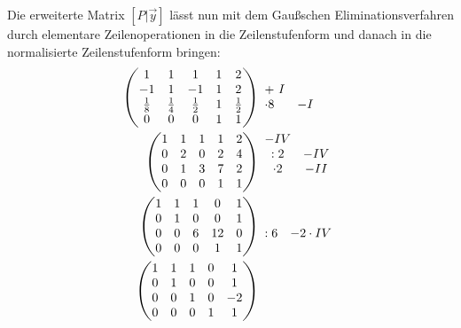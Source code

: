 Die erweiterte Matrix $\displaystyle [ P|\vec{y}]$ lässt nun mit dem Gaußschen Eliminationsverfahren durch elementare Zeilenoperationen in die Zeilenstufenform und danach in die normalisierte Zeilenstufenform bringen:
\begin{align*}
	\begin{pmatrix}
		1 & 1 & 1 & 1 & 2\\
		-1 & 1 & -1 & 1 & 2\\
		\frac{1}{8} & \frac{1}{4} & \frac{1}{2} & 1 & \frac{1}{2}\\
		0 & 0 & 0 & 1 & 1
	\end{pmatrix} & \begin{array}{ l c }
		& \\
		+\ I & \\
		\cdot 8 & -I\\
		& 
	\end{array}\\
	\begin{pmatrix}
		1 & 1 & 1 & 1 & 2\\
		0 & 2 & 0 & 2 & 4\\
		0 & 1 & 3 & 7 & 2\\
		0 & 0 & 0 & 1 & 1
	\end{pmatrix} & \begin{array}{ c c }
		-IV & \\
		:2 & -IV\\
		\cdot 2 & -II\\
		& 
	\end{array}\\
	\begin{pmatrix}
		1 & 1 & 1 & 0 & 1\\
		0 & 1 & 0 & 0 & 1\\
		0 & 0 & 6 & 12 & 0\\
		0 & 0 & 0 & 1 & 1
	\end{pmatrix} & \begin{array}{ c c }
		& \\
		& \\
		:6 & -2\cdot IV\\
		& 
	\end{array}\\
	\begin{pmatrix}
		1 & 1 & 1 & 0 & 1\\
		0 & 1 & 0 & 0 & 1\\
		0 & 0 & 1 & 0 & -2\\
		0 & 0 & 0 & 1 & 1
	\end{pmatrix} & \begin{array}{ c c }

\end{array}
\end{align*}
